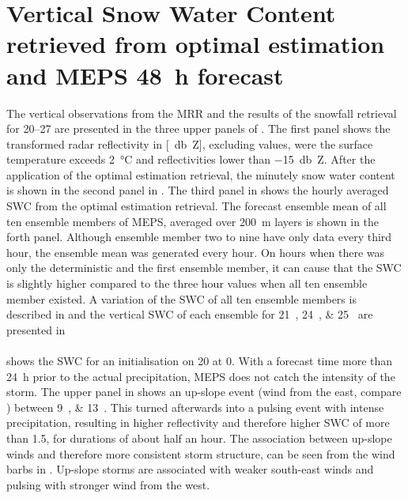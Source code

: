 
\section{Vertical Snow Water Content retrieved from optimal estimation and MEPS \SI{48}{\hour} forecast}
The vertical observations from the MRR and the results of the snowfall retrieval for \SIrange{20}{27}{\dec} are presented in the three upper panels of . The first panel shows the transformed radar reflectivity in [\SI{}{\decibel Z}], excluding values, were the surface temperature exceeds \SI{2}{\celsius} and reflectivities lower than \SI{-15}{\decibel Z}. After the application of the optimal estimation retrieval, the minutely snow water content is shown in the second panel in . The third panel in  shows the hourly averaged SWC from the optimal estimation retrieval. The forecast ensemble mean of all ten ensemble members of MEPS, averaged over \SI{200}{\metre} layers is shown in the forth panel. Although ensemble member two to nine have only data every third hour, the ensemble mean was generated every hour. On hours when there was only the deterministic and the first ensemble member, it can cause that the SWC is slightly higher compared to the three hour values when all ten ensemble member existed. A variation of the SWC of all ten ensemble members is described in  and the vertical SWC of each ensemble for \SIlist{21;24;25}{\dec} are presented in 
\\
\\
 shows the SWC for an initialisation on \SI{20}{\dec} at \SI{0}{\UTC}. With a forecast time more than \SI{24}{\hour} prior to the actual precipitation, MEPS does not catch the intensity of the storm. The upper panel in  shows an up-slope event (wind from the east, compare ) between \SIlist{9;13}{\UTC}. This turned afterwards into a pulsing event with intense precipitation, resulting in higher reflectivity and therefore higher SWC of more than \SI{1.5}{\SWC}, for durations of about half an hour. The association between up-slope winds and therefore more consistent storm structure, can be seen from the wind barbs in . Up-slope storms are associated with weaker south-east winds and pulsing with stronger wind from the west. 
